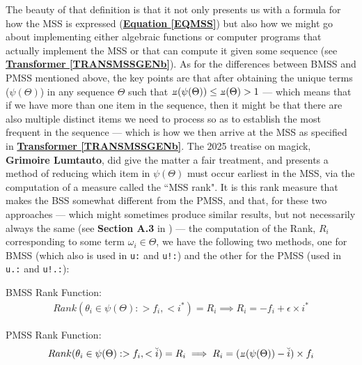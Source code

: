 \documentclass[a4paper, 18pt]{book} %
\newcommand{\invpi}{\rotatebox[origin=c]{180}{$\pi$}}
\begin{document}
{{{ 
The beauty of that definition is that it not only presents us with a formula for how the MSS is expressed (\textbf{\hyperref[EQMSS]{Equation \ref{EQMSS}}}) but also how we might go about implementing either algebraic functions or computer programs that actually implement the MSS or that can compute it given some sequence (see \textbf{\hyperref[TRANSMSSGENb]{Transformer \ref{TRANSMSSGENb}}}). As for the differences between BMSS and PMSS mentioned above, the key points are that after obtaining the unique terms ($\psi(\Theta)$) in any sequence $\Theta$ such that $\invpi(\psi(\Theta)) \leq \invpi(\Theta) > 1$ --- which means that if we have more than one item in the sequence, then it might be that there are also multiple distinct items we need to process so as to establish the most frequent in the sequence --- which is how we then arrive at the MSS as specified in  \textbf{\hyperref[TRANSMSSGENb]{Transformer \ref{TRANSMSSGENb}}}. The 2025 treatise on magick, \textbf{Grimoire Lumtauto}\cite{lutalo_2025_grimlumtauto}, did give the matter a fair treatment, and presents a method of reducing which item in $\psi(\Theta)$ must occur earliest in the MSS, via the computation of a measure called the ``MSS rank". It is this rank measure that makes the BSS somewhat different from the PMSS, and that, for these two approaches --- which might sometimes produce similar results, but not necessarily always the same (see \textbf{Section A.3} in \cite{lutalo_2025_grimlumtauto}) --- the computation of the Rank, $R_i$ corresponding to some term $\omega_i \in \Theta$, we have the following two methods, one for BMSS (which also is used in \texttt{u:} and \texttt{u!:}) and the other for the PMSS (used in \texttt{u.:} and \texttt{u!.:}):


\vspace{2em}
BMSS Rank Function:
\vspace{1em}
\begin{multline}
\label{EQTNBMSSRANK}
Rank(\theta_i \in \psi(\Theta): > f_i, < i^*) = R_i \implies R_i = -f_i + \epsilon \times i^*
\end{multline}
\vspace{1em}


PMSS Rank Function:
\vspace{1em}
\begin{multline}
\label{EQTNPMSSRANK}
Rank(\theta_i \in \psi(\Theta): > f_i, < \breve{i}) = R_i \implies R_i = (\invpi(\psi(\Theta)) - \breve{i}) \times f_i
\end{multline}
\vspace{2em}


}}}
\end{document}
